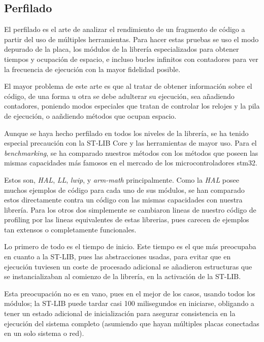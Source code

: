\documentclass{report}
\begin{document}
\subsection{Perfilado}
El perfilado es el arte de analizar el rendimiento de un fragmento de código a partir del uso de múltiples herramientas. Para hacer estas pruebas se uso el modo depurado de la placa, los módulos de la librería especializados para obtener tiempos y ocupación de espacio, e incluso bucles infinitos con contadores para ver la frecuencia de ejecución con la mayor fidelidad posible. 
\par \vspace{0.3cm}
El mayor problema de este arte es que al tratar de obtener información sobre el código, de una forma u otra se debe adulterar su ejecución, sea añadiendo contadores, poniendo modos especiales que tratan de controlar los relojes y la pila de ejecución, o aañdiendo métodos que ocupan espacio. 
\par \vspace{0.3cm}
Aunque se haya hecho perfilado en todos los niveles de la librería, se ha tenido especial precaución con la ST-LIB Core y las herramientas de mayor uso. Para el \textit{benchmarking}, se ha comparado nuestros métodos con los métodos que poseen las mismas capacidades más famosos en el mercado de los microcontroladores stm32. 
\par
Estos son, \textit{HAL}, \textit{LL}, \textit{lwip}, y \textit{arm-math} principalmente. Como la \textit{HAL} posee muchos ejemplos de código para cada uno de sus módulos, se han comparado estos directamente contra un código con las mismas capacidades con nuestra librería. Para los otros dos simplemente se cambiaron lineas de nuestro código de profiling por las lineas equivalentes de estas librerias, pues carecen de ejemplos tan extensos o completamente funcionales. 
\par \vspace{0.3cm}
Lo primero de todo es el tiempo de inicio. Este tiempo es el que más preocupaba en cuanto a la ST-LIB, pues las abstracciones usadas, para evitar que en ejecución tuviesen un coste de procesado adicional se añadieron estructuras que se instancializaban al comienzo de la librería, en la activación de la ST-LIB. \par
Esta preocupación no es en vano, pues en el mejor de los casos, usando todos los módulos; la ST-LIB puede tardar casi 100 milisegundos en iniciarse, obligando a tener un estado adicional de inicialización para asegurar consistencia en la ejecución del sistema completo (asumiendo que hayan múltiples placas conectadas en un solo sistema o red). \par
\end{document}
